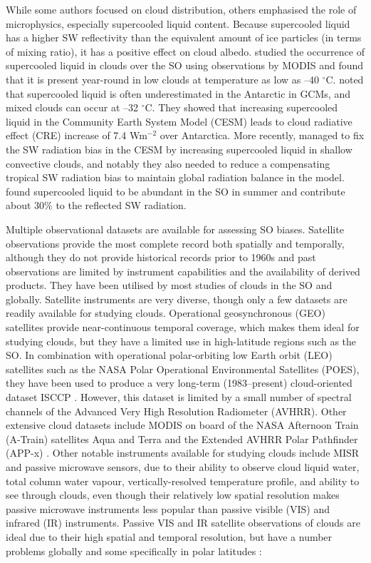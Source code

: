 While some authors focused on cloud distribution, others
emphasised the role of microphysics, especially supercooled liquid content.
Because supercooled liquid has a higher SW reflectivity than the equivalent amount
of ice particles (in terms of mixing ratio), it has a positive effect on cloud albedo.
\cite{morrison2011} studied the occurrence of supercooled liquid in clouds
over the SO using observations by MODIS and
found that it is present year-round in low clouds at temperature as low as
--40 $^{\circ}$C.
\cite{lawson2014} noted that supercooled liquid is often
underestimated in the Antarctic in GCMs, and mixed clouds can occur at
--32 $^{\circ}$C.
They showed that increasing supercooled liquid in the
Community Earth System Model (CESM) leads to cloud radiative effect (CRE)
increase of 7.4 Wm$^{-2}$ over Antarctica. More recently, \cite{kay2016}
managed to fix the SW radiation bias in the CESM by increasing supercooled liquid
in shallow convective clouds, and notably they also needed to reduce a
compensating tropical SW radiation bias to maintain global radiation balance
in the model.
\cite{bodas-salcedo2016} found supercooled liquid to be abundant in
the SO in summer and contribute about 30\% to the reflected
SW radiation.

Multiple observational datasets are available for assessing SO biases.
Satellite observations provide the most complete record both spatially and
temporally, although they do not provide historical records prior to
1960s and past observations are limited by instrument capabilities and
the availability of derived products. They have been utilised by most studies
of clouds in the SO and globally. Satellite instruments are very diverse, though only a few
datasets are readily available for studying clouds.
Operational geosynchronous (GEO) satellites provide near-continuous temporal
coverage,
which makes them ideal for studying clouds, but they have a limited use in
high-latitude regions such as the SO. In combination with operational polar-orbiting
low Earth orbit (LEO) satellites such as the NASA
Polar Operational Environmental Satellites (POES),
they have been used to produce a very long-term (1983--present) cloud-oriented
dataset ISCCP
\citep{schiffer1983}. However, this dataset is limited by
a small number of spectral channels of the Advanced Very High Resolution Radiometer
(AVHRR). Other extensive
cloud datasets include MODIS
on board of the NASA Afternoon Train (A-Train) satellites Aqua and Terra
and the Extended AVHRR Polar Pathfinder (APP-x) \citep{meier1997}. Other notable instruments available
for studying clouds include MISR
and passive
microwave sensors, due to their ability to observe cloud liquid water,
total column water vapour, vertically-resolved temperature profile, and
ability to see through clouds, even though their relatively low spatial
resolution makes passive microwave instruments less popular than passive visible (VIS) and infrared (IR)
instruments.
Passive VIS and IR satellite observations of clouds are ideal due to their high
spatial and temporal resolution, but have a number problems globally and some
specifically in polar latitudes \citep{bromwich2012}:

